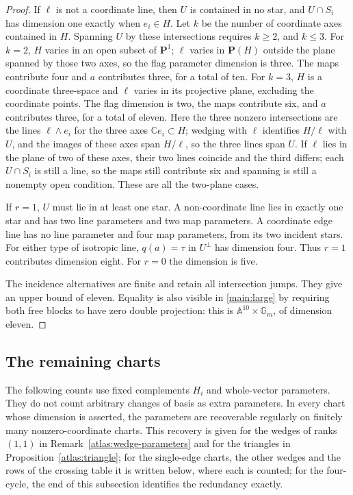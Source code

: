 \documentclass[11pt,letterpaper]{article}
\newcommand{\C}{\mathbb C}
\newcommand{\A}{\mathbb A}
\newcommand{\Gm}{\mathbb G_m}
\theoremstyle{definition}
\begin{document}
\begin{proof}
If \(\ell\) is not a coordinate line, then \(U\) is contained in no star,
and \(U\cap S_i\) has dimension one exactly when \(e_i\in H\).
Let \(k\) be the number of coordinate axes contained in \(H\).
Spanning \(U\) by these intersections requires \(k\ge2\), and \(k\le3\).
For \(k=2\), \(H\) varies in an open subset of \(\mathbf P^1\);
\(\ell\) varies in \(\mathbf P(H)\) outside the plane spanned by those
two axes, so the flag parameter dimension is three. The maps contribute
four and \(a\) contributes three, for a total of ten.
For \(k=3\), \(H\) is a coordinate three-space and \(\ell\) varies in
its projective plane, excluding the coordinate points. The flag dimension
is two, the maps contribute six, and \(a\) contributes three, for a total
of eleven.
Here the three nonzero intersections are the lines \(\ell\wedge e_i\) for
the three axes \(\C e_i\subset H\); wedging with \(\ell\) identifies
\(H/\ell\) with \(U\), and the images of these axes span \(H/\ell\), so
the three lines span \(U\). If \(\ell\) lies in the plane of two of these
axes, their two lines coincide and the third differs; each \(U\cap S_i\)
is still a line, so the maps still contribute six and spanning is still
a nonempty open condition.
These are all the two-plane cases.

If \(r=1\), \(U\) must lie in at least one star. A non-coordinate line
lies in exactly one star and has two line parameters and two map
parameters. A coordinate edge line has no line parameter and four map
parameters, from its two incident stars. For either type of isotropic
line, \(q(a)=\tau\) in \(U^\perp\) has dimension four. Thus \(r=1\)
contributes dimension eight. For \(r=0\) the dimension is five.

The incidence alternatives are finite and retain all intersection jumps.
They give an upper bound of eleven. Equality is also visible in
\eqref{main:large} by requiring both free blocks to have zero double
projection: this is \(\A^{10}\times\Gm\), of dimension eleven.
\end{proof}

\subsection{The remaining charts}\label{geom:counts}

The following counts use fixed complements \(H_i\) and whole-vector
parameters. They do not count arbitrary changes of basis as extra
parameters. In every chart whose dimension is asserted, the parameters
are recoverable regularly on finitely many nonzero-coordinate charts.
This recovery is given for the wedges of ranks \((1,1)\) in
Remark~\ref{atlas:wedge-parameters} and for the triangles in
Proposition~\ref{atlas:triangle}; for the single-edge charts, the other
wedges and the rows of the crossing table it is written below, where each
is counted; for the four-cycle, the end of this subsection identifies the
redundancy exactly.
\end{document}
